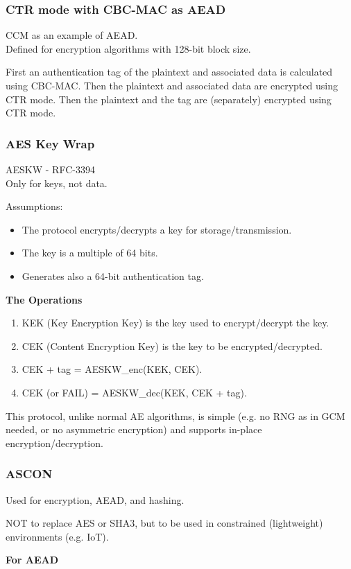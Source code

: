 \subsubsection{CTR mode with CBC-MAC as AEAD}
\begin{center}
    CCM as an example of AEAD. \\ Defined for encryption algorithms with 128-bit block size.
\end{center}
First an authentication tag of the plaintext and associated data is calculated using CBC-MAC. Then the plaintext and associated data are encrypted using CTR mode. Then the plaintext and the tag are (separately) encrypted using CTR mode.

\subsubsection{AES Key Wrap}
\begin{center}
    AESKW - RFC-3394 \\ Only for keys, not data.
\end{center}
Assumptions:
\begin{itemize}
    \item The protocol encrypts/decrypts a key for storage/transmission.
    \item The key is a multiple of 64 bits.
    \item Generates also a 64-bit authentication tag.
\end{itemize}

\begin{center}
    \textbf{The Operations}
\end{center}
\begin{enumerate}
    \item KEK (Key Encryption Key) is the key used to encrypt/decrypt the key.
    \item CEK (Content Encryption Key) is the key to be encrypted/decrypted.
    \item {CEK} + tag = AESKW\_enc(KEK, CEK).
    \item CEK (or FAIL) = AESKW\_dec(KEK, {CEK} + tag).
\end{enumerate}
This protocol, unlike normal AE algorithms, is simple (e.g. no RNG as in GCM needed, or no asymmetric encryption) and supports in-place encryption/decryption.

\subsubsection{ASCON}
\begin{center}
    Used for encryption, AEAD, and hashing.
\end{center}
NOT to replace AES or SHA3, but to be used in constrained (lightweight) environments (e.g. IoT).
\begin{center}
    \textbf{For AEAD}
\end{center}

